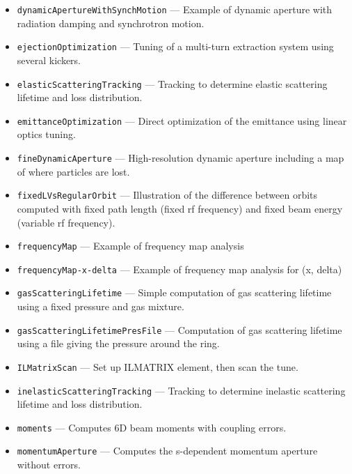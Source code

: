 \begin{itemize}
\begin{itemize}
\item \verb|dynamicApertureWithSynchMotion| --- 
 Example of dynamic aperture with radiation damping and synchrotron motion. 

\item \verb|ejectionOptimization| --- 
 Tuning of a multi-turn extraction system using several kickers. 

\item \verb|elasticScatteringTracking| --- 
Tracking to determine elastic scattering lifetime and loss distribution.

\item \verb|emittanceOptimization| --- 
 Direct optimization of the emittance using linear optics tuning. 

\item \verb|fineDynamicAperture| --- 
 High-resolution dynamic aperture including a map of where particles are lost. 

\item \verb|fixedLVsRegularOrbit| --- 
 Illustration of the difference between orbits computed with fixed path length (fixed rf frequency) and fixed beam energy (variable rf frequency). 

\item \verb|frequencyMap| --- 
 Example of frequency map analysis 

\item \verb|frequencyMap-x-delta| --- 
 Example of frequency map analysis for (x, delta)


\item \verb|gasScatteringLifetime| --- 
 Simple computation of gas scattering lifetime using a fixed pressure and gas mixture. 

\item \verb|gasScatteringLifetimePresFile| --- 
 Computation of gas scattering lifetime using a file giving the pressure around the ring. 

\item \verb|ILMatrixScan| --- 
Set up ILMATRIX element, then scan the tune.


\item \verb|inelasticScatteringTracking| --- 
Tracking to determine inelastic scattering lifetime and loss distribution.

\item \verb|moments| --- 
 Computes 6D beam moments with coupling errors. 

\item \verb|momentumAperture| --- 
 Computes the s-dependent momentum aperture without errors. 


\end{itemize}
\end{itemize}
